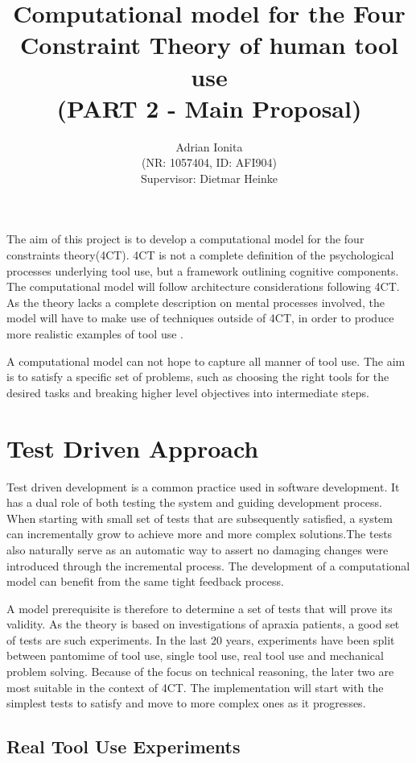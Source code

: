 \documentclass[11]{article}
\title{
  Computational model for the Four Constraint Theory of human tool use\\  
  \setlength{\parskip}{0.5em}  
  \normalsize (PART 2 - Main Proposal)
  }
\date{}
\author{Adrian Ionita\\
\small{(NR: 1057404, ID: AFI904)}\\
Supervisor: Dietmar Heinke}
\begin{document}
\maketitle 	

The aim of this project is to develop a computational model for the four constraints theory(4CT).
4CT is not a complete definition of the psychological processes underlying tool use, but a framework outlining cognitive components.   
The computational model will follow architecture considerations following 4CT.  As the theory lacks a complete description on mental processes involved, the model will have to make use of techniques outside of 4CT, in order to produce more realistic examples of tool use . 

A computational model can not hope to capture all manner of tool use. The aim is to satisfy a specific set of problems, such as choosing the right tools for the desired tasks and breaking higher level objectives into intermediate steps.

\section{Test Driven Approach}

Test driven development is a common practice used in software development\cite{janzen2005}\cite{ibm2003}. It has a dual role of both testing the system and guiding development process\cite{janzen2005architecture}. When starting with small set of tests that are subsequently satisfied, a system can incrementally grow to achieve more and more complex solutions.The tests also naturally serve as an automatic way to assert no damaging changes were introduced through the incremental process. The development of a computational model can benefit from the same tight feedback process.

A model prerequisite is therefore to determine a set of tests that will prove its validity. As the theory is based on investigations of apraxia patients, a good set of tests are such experiments. In the last 20 years, experiments have been split between pantomime of tool use, single tool use, real tool use and mechanical problem solving\cite{baumard2014}. Because of the focus on technical reasoning, the later two are most suitable in the context of 4CT. The implementation will start with the simplest tests to satisfy and move to more complex ones as it progresses.

\subsection{Real Tool Use Experiments}
\end{document}
